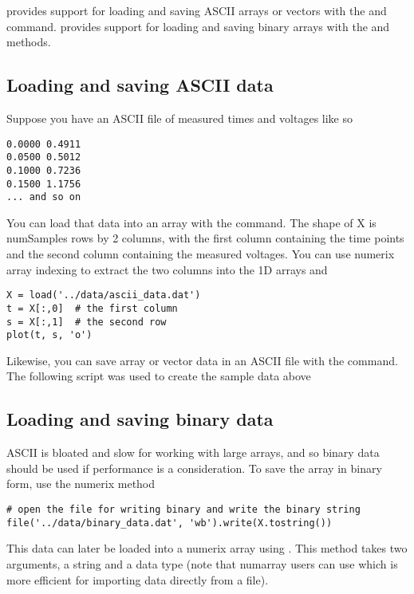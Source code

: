 \documentclass[twoside]{book}
\begin{document}
 provides support for loading and saving
ASCII arrays or vectors with the  and  command.
 provides support for loading and saving
binary arrays with the  and  methods.

\subsection{Loading and saving ASCII data}
\label{sec:ascii_data}
Suppose you have an ASCII file of measured times and voltages like so

\begin{verbatim}
0.0000 0.4911
0.0500 0.5012
0.1000 0.7236
0.1500 1.1756
... and so on
\end{verbatim}

\noindent You can load that data into an array  with the 
command.  The shape of X is numSamples rows by 2 columns, with the
first column containing the time points and the second column
containing the measured voltages.  You can use numerix array indexing
to extract the two columns into the 1D arrays  and 

\begin{lstlisting}
X = load('../data/ascii_data.dat')
t = X[:,0]  # the first column
s = X[:,1]  # the second row
plot(t, s, 'o')
\end{lstlisting}

Likewise, you can save array or vector data in an ASCII file
with the  command.  The following script was used to create
the sample data above



\subsection{Loading and saving binary data}
\label{sec:binary_data}

ASCII is bloated and slow for working with large arrays, and so binary
data should be used if performance is a consideration.  To save the
array  in binary form, use the numerix  method

\begin{lstlisting}
# open the file for writing binary and write the binary string
file('../data/binary_data.dat', 'wb').write(X.tostring())
\end{lstlisting}

\noindent This data can later be loaded into a numerix array using
.  This method takes two arguments, a string and a
data type (note that numarray users can use  which is
more efficient for importing data directly from a file).  
\end{document}
